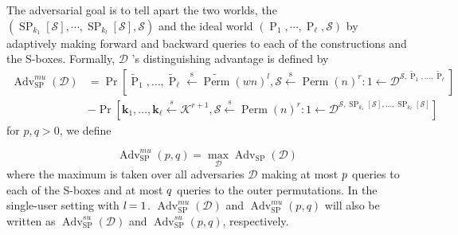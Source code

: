 The adversarial goal is to tell apart the two worlds, the $(\operatorname{SP}_{k_1}[\mathcal{S}], \cdots ,\operatorname{SP}_{k_l}[\mathcal{S}],\mathcal{S})$ and the ideal world $(\operatorname{P}_1, \cdots ,\operatorname{P}_{\ell},\mathcal{S})$ by adaptively making forward and backward queries to each of the constructions and the S-boxes. Formally, $\mathcal{D}$ 's distinguishing advantage is defined by
$$
\begin{aligned}
\operatorname{Adv}_{\mathrm{SP}}^{mu}(\mathcal{D}) &=\operatorname{Pr}\left[\widetilde{\operatorname{P}}_{1}, \ldots, \widetilde{\operatorname{P}}_{\ell} \stackrel{\mathrm{s}}{\leftarrow} \widetilde{\operatorname{Perm}}(w n)^l, \mathcal{S} \stackrel{\mathrm{s}}{\leftarrow} \operatorname{Perm}(n)^{r}: 1 \leftarrow \mathcal{D}^{\mathcal{S}, \widetilde{\operatorname{P}}_{1}, \ldots, \widetilde{\operatorname{P}}_{\ell}}\right] \\
&-\operatorname{Pr}\left[\mathbf{k}_{1}, \ldots, \mathbf{k}_{\ell} \stackrel{s}{\leftarrow} \mathcal{K}^{r+1}, \mathcal{S} \stackrel{s}{\leftarrow} \operatorname{Perm}(n)^{r}: 1 \leftarrow \mathcal{D}^{\mathcal{S}, \operatorname{SP}_{k_{1}}[\mathcal{S}], \ldots, \operatorname{SP}_{k_{\ell}}[\mathcal{S}]}\right]
\end{aligned}                                                                                                                                                                                                                        $$                                                                                                                                                                                                                                                                                                                                                                                                                                                                                                                                                                                                                                                                                                                                               for $p,q > 0$, we define

$$
\operatorname{Adv}^{mu}_{\mathrm{SP}}(p, q) = \max _{\mathcal{D}} \operatorname{Adv}_{\mathrm{SP}}(\mathcal{D})
$$
where the maximum is taken over all adversaries $\mathcal{D}$ making at most $\mathnormal{p}$ queries to each of the S-boxes and at most $\mathnormal{q}$ queries to the outer permutations. In the single-user setting with $\emph{l} = 1$. $\operatorname{Adv}^{mu}_{\mathrm{SP}}(\mathcal{D})$ and $\operatorname{Adv}^{mu}_{\mathrm{SP}}(p, q)$  will also be written as $\operatorname{Adv}^{su}_{\mathrm{SP}}(\mathcal{D})$ and $\operatorname{Adv}^{su}_{\mathrm{SP}}(p, q)$, respectively.


